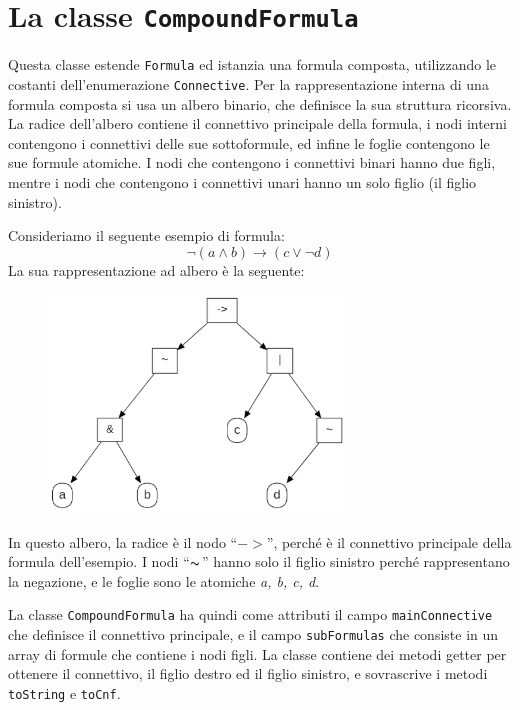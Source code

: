 \documentclass[a4paper,12pt]{report}
\begin{document}
\section{La classe \texttt{CompoundFormula}}
Questa classe estende \texttt{Formula} ed istanzia una formula composta, utilizzando le costanti dell'enumerazione \texttt{Connective}. Per la rappresentazione interna di una formula composta si usa un albero binario, che definisce la sua struttura ricorsiva. La radice dell'albero contiene il connettivo principale della formula, i nodi interni contengono i connettivi delle sue sottoformule, ed infine le foglie contengono le sue formule atomiche. I nodi che contengono i connettivi binari hanno due figli, mentre i nodi che contengono i connettivi unari hanno un solo figlio (il figlio sinistro).

Consideriamo il seguente esempio di formula:
\[\lnot(a \land b) \to (c \lor \lnot d)\]
La sua rappresentazione ad albero è la seguente:
\begin{figure}[H]
    \centering
    \includegraphics[width=0.7\textwidth, height=0.4\textheight]{img/albero.png}
\end{figure}
\noindent In questo albero, la radice è il nodo ``$-\!>$'', perché è il connettivo principale della formula dell'esempio. I nodi ``$\thicksim$'' hanno solo il figlio sinistro perché rappresentano la negazione, e le foglie sono le atomiche \emph{a, b, c, d}.

La classe \texttt{CompoundFormula} ha quindi come attributi il campo \texttt{mainConnective} che definisce il connettivo principale, e il campo \texttt{subFormulas} che consiste in un array di formule che contiene i nodi figli. La classe contiene dei metodi getter per ottenere il connettivo, il figlio destro ed il figlio sinistro, e sovrascrive i metodi \texttt{toString} e \texttt{toCnf}.
\end{document}
